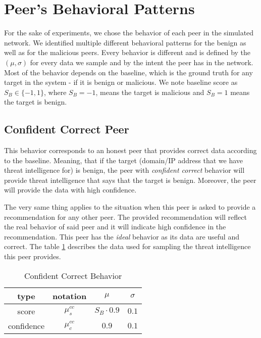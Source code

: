 \section{Peer's Behavioral Patterns}
\label{sec:peers-behavioral-patterns}
For the sake of experiments, we chose the behavior of each peer in the simulated network. We identified multiple different behavioral patterns for the benign as well as for the malicious peers.
Every behavior is different and is defined by the $(\mu, \sigma)$ for every data we sample and by the intent the peer has in the network.
Most of the behavior depends on the baseline, which is the ground truth for any target in the system - if it is benign or malicious.
We note baseline score as $S_{B} \in \{-1, 1\}$, where $S_{B} = -1$, means the target is malicious and $S_{B} = 1$ means the target is benign.


\subsection{Confident Correct Peer}
\label{subsubsec:confident-correct-peer}
This behavior corresponds to an honest peer that provides correct data according to the baseline. 
Meaning, that if the target (domain/IP address that we have threat intelligence for) is benign, the peer with \textit{confident correct} behavior will provide threat intelligence that says that the target is benign. 
Moreover, the peer will provide the data with high confidence.

The very same thing applies to the situation when this peer is asked to provide a recommendation for any other peer. 
The provided recommendation will reflect the real behavior of said peer and it will indicate high confidence in the recommendation.
This peer has the \textit{ideal} behavior as its data are useful and correct.
The table \ref{tab:confident-correct} describes the data used for sampling the threat intelligence this peer provides.

\begin{table}[!ht]
    \centering
    \begin{tabular}{c|c|c|c}
        type & notation & $\mu$ & $\sigma$ \\
        \hline
        score & $\mu^{cc}_{s}$ & $S_{B} \cdot 0.9$ & $0.1$ \\
        confidence & $\mu^{cc}_{c}$ &  $0.9$ & $0.1$ \\
    \end{tabular}
    \caption{Confident Correct Behavior}
    \label{tab:confident-correct}
\end{table}

